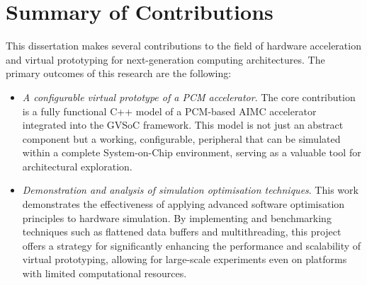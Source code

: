 \section{Summary of Contributions}\label{sec:contri}
This dissertation makes several contributions to the field of hardware acceleration and virtual prototyping for next-generation computing architectures.
The primary outcomes of this research are the following:
\begin{itemize}
\item \emph{A configurable virtual prototype of a PCM accelerator}.
The core contribution is a fully functional C++ model of a PCM-based AIMC accelerator integrated into the GVSoC framework.
This model is not just an abstract component but a working, configurable, peripheral that can be simulated within a complete System-on-Chip 
environment, serving as a valuable tool for architectural exploration.\\
\item \emph{Demonstration and analysis of simulation optimisation techniques}.
This work demonstrates the effectiveness of applying advanced software optimisation principles to hardware simulation.
By implementing and benchmarking techniques such as flattened data buffers and multithreading, this project offers a strategy for significantly enhancing the performance and scalability of virtual prototyping, allowing for large-scale experiments even on platforms with limited computational resources.
\end{itemize}
